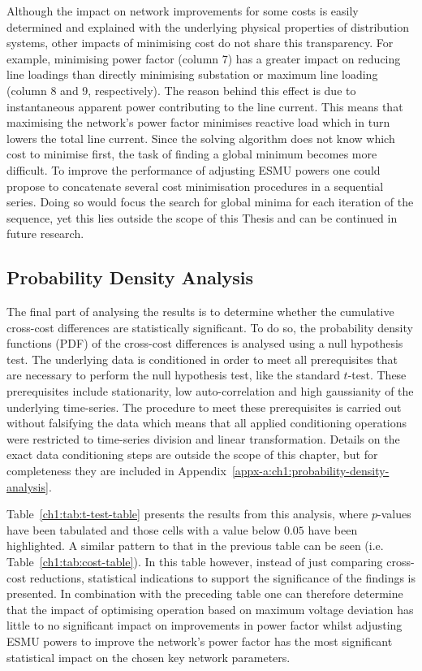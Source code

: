 Although the impact on network improvements for some costs is easily determined and explained with the underlying physical properties of distribution systems, other impacts of minimising cost do not share this transparency.
For example, minimising power factor (column 7) has a greater impact on reducing line loadings than directly minimising substation or maximum line loading (column 8 and 9, respectively).
The reason behind this effect is due to instantaneous apparent power contributing to the line current.
This means that maximising the network's power factor minimises reactive load which in turn lowers the total line current.
Since the solving algorithm does not know which cost to minimise first, the task of finding a global minimum becomes more difficult.
To improve the performance of adjusting ESMU powers one could propose to concatenate several cost minimisation procedures in a sequential series.
Doing so would focus the search for global minima for each iteration of the sequence, yet this lies outside the scope of this Thesis and can be continued in future research.

\subsection{Probability Density Analysis}
\label{ch1:subsec:probability-density-analysis}

The final part of analysing the results is to determine whether the cumulative cross-cost differences are statistically significant.
To do so, the probability density functions (PDF) of the cross-cost differences is analysed using a null hypothesis test.
The underlying data is conditioned in order to meet all prerequisites that are necessary to perform the null hypothesis test, like the standard $t$-test.
These prerequisites include stationarity, low auto-correlation and high gaussianity of the underlying time-series.
The procedure to meet these prerequisites is carried out without falsifying the data which means that all applied conditioning operations were restricted to time-series division and linear transformation.
Details on the exact data conditioning steps are outside the scope of this chapter, but for completeness they are included in Appendix~\ref{appx-a:ch1:probability-density-analysis}.



Table~\ref{ch1:tab:t-test-table} presents the results from this analysis, where $p$-values have been tabulated and those cells with a value below $0.05$ have been highlighted.
A similar pattern to that in the previous table can be seen (i.e. Table~\ref{ch1:tab:cost-table}).
In this table however, instead of just comparing cross-cost reductions, statistical indications to support the significance of the findings is presented.
In combination with the preceding table one can therefore determine that the impact of optimising operation based on maximum voltage deviation has little to no significant impact on improvements in power factor whilst adjusting ESMU powers to improve the network's power factor has the most significant statistical impact on the chosen key network parameters.
